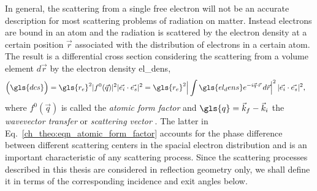 In general, the scattering from a single free electron will not be an accurate description for most scattering problems of radiation on matter. Instead electrons are bound in an atom and the radiation is scattered by the electron density at a certain position $\vec{r}$ associated with the distribution of electrons in a certain atom. The result is a differential cross section considering the scattering from a volume element $d\vec{r}$ by the electron density \gls{el_dens},
\begin{align}
\Big(\gls{dcs}\Big) &= \gls{r_e}^2 |f^0(\vec{q})|^2 |\vec{e_i} \cdot \vec{e_s}|^2 = \gls{r_e}^2 \Big|\int \gls{el_dens} e^{- i \vec{q} \cdot \vec{r}} \, d\vec{r}\Big|^2 \, |\vec{e_i} \cdot \vec{e_s}|^2 \text{,} \label{ch_theo:eqn_atomic_form_factor}
\end{align}
where $f^0(\vec{q})$ is called the \emph{atomic form factor} and $\gls{q} = \vec{k}_f - \vec{k}_{i}$ the \emph{wavevector transfer} or \emph{scattering vector} \cite{daillant_x-ray_2009}. The latter in Eq.~\eqref{ch_theo:eqn_atomic_form_factor} accounts for the phase difference between different scattering centers in the spacial electron distribution and is an important characteristic of any scattering process. Since the scattering processes described in this thesis are considered in reflection geometry only, we shall define it in terms of the corresponding incidence and exit angles below.

